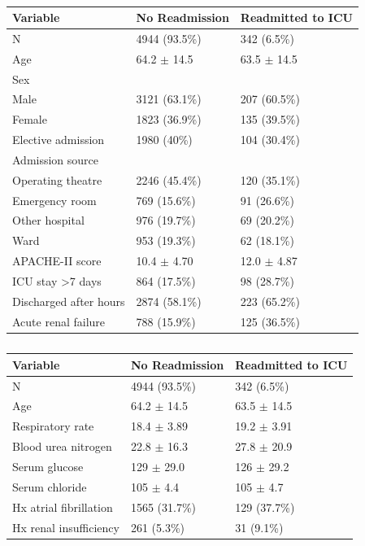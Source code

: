 \documentclass[onecolumn]{article}
\begin{document}
\begin{table}[hb]
\centering
	\renewcommand{\arraystretch}{1.4}
		\caption{}%
	\begin{tabular}{lp{2.5cm}p{2cm}}
		\hline
		Variable & No Readmission & Readmitted to ICU\\
		\hline
		N & 4944 (93.5\%)  &      342 (6.5\%)\\
		Age & 64.2 $\pm$ 14.5 & 63.5 $\pm$ 14.5\\
		Sex &&\\
		\quad Male & 3121 (63.1\%)   &    207 (60.5\%)\\
		\quad Female & 1823 (36.9\%)  &     135 (39.5\%)\\
		Elective admission & 1980 (40\%)  &     104 (30.4\%)\\
		Admission source &&\\
		\quad Operating theatre &2246 (45.4\%)    &   120 (35.1\%)\\
		\quad Emergency room &769 (15.6\%)  &      91 (26.6\%)\\
		\quad Other hospital &976 (19.7\%)    &    69 (20.2\%)\\
		\quad Ward &953 (19.3\%)   &     62 (18.1\%)\\
		APACHE-II score & 10.4 $ \pm $ 4.70 & 12.0 $ \pm $ 4.87\\
		ICU stay >7 days & 864 (17.5\%)   &     98 (28.7\%)\\
		Discharged after hours & 2874 (58.1\%)    &   223 (65.2\%)\\
		Acute renal failure & 788 (15.9\%)   &    125 (36.5\%)\\
		\hline
	\end{tabular}
	\label{Table1Frost}
\end{table}


\begin{table}[hb]
\centering
	\renewcommand{\arraystretch}{1.4}
		\caption{}%
	\begin{tabular}{lp{2.5cm}p{2cm}}
		\hline
		Variable & No Readmission & Readmitted to ICU\\
		\hline
		N & 4944 (93.5\%)  &      342 (6.5\%)\\
		Age & 64.2 $\pm$ 14.5 & 63.5 $\pm$ 14.5\\
		Respiratory rate & 18.4 $ \pm $ 3.89 & 19.2 $ \pm $ 3.91\\
		Blood urea nitrogen & 22.8 $ \pm $ 16.3 & 27.8 $ \pm $ 20.9\\
		Serum glucose & 129 $ \pm $ 29.0 & 126 $ \pm $ 29.2\\
		Serum chloride & 105 $ \pm $ 4.4& 105 $\pm$ 4.7 \\
		Hx atrial fibrillation&1565 (31.7\%)    &   129 (37.7\%)\\
		Hx renal insufficiency &261 (5.3\%)    &     31 (9.1\%)\\
		\hline
	\end{tabular}
	\label{Table1Martin}
\end{table}
\end{document}
